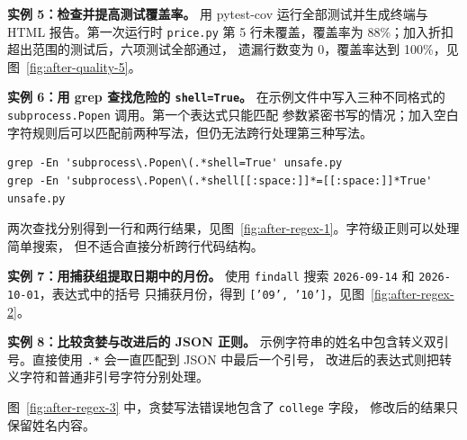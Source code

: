 \documentclass[12pt,a4paper,fontset=fandol]{ctexart}
\begin{document}

\noindent\textbf{实例 5：检查并提高测试覆盖率。}
用 pytest-cov 运行全部测试并生成终端与 HTML 报告。第一次运行时 \texttt{price.py}
第 5 行未覆盖，覆盖率为 88\%；加入折扣超出范围的测试后，六项测试全部通过，
遗漏行数变为 0，覆盖率达到 100\%，见图~\ref{fig:after-quality-5}。


\noindent\textbf{实例 6：用 grep 查找危险的 \texttt{shell=True}。}
在示例文件中写入三种不同格式的 \texttt{subprocess.Popen} 调用。第一个表达式只能匹配
参数紧密书写的情况；加入空白字符规则后可以匹配前两种写法，但仍无法跨行处理第三种写法。

\begin{lstlisting}[language=shell,caption={使用两种正则查找 shell=True}]
grep -En 'subprocess\.Popen\(.*shell=True' unsafe.py
grep -En 'subprocess\.Popen\(.*shell[[:space:]]*=[[:space:]]*True' unsafe.py
\end{lstlisting}

两次查找分别得到一行和两行结果，见图~\ref{fig:after-regex-1}。字符级正则可以处理简单搜索，
但不适合直接分析跨行代码结构。


\noindent\textbf{实例 7：用捕获组提取日期中的月份。}
使用 \texttt{findall} 搜索 \texttt{2026-09-14} 和 \texttt{2026-10-01}，表达式中的括号
只捕获月份，得到 \texttt{['09', '10']}，见图~\ref{fig:after-regex-2}。


\noindent\textbf{实例 8：比较贪婪与改进后的 JSON 正则。}
示例字符串的姓名中包含转义双引号。直接使用 \texttt{.*} 会一直匹配到 JSON 中最后一个引号，
改进后的表达式则把转义字符和普通非引号字符分别处理。



图~\ref{fig:after-regex-3} 中，贪婪写法错误地包含了 \texttt{college} 字段，
修改后的结果只保留姓名内容。

\end{document}
